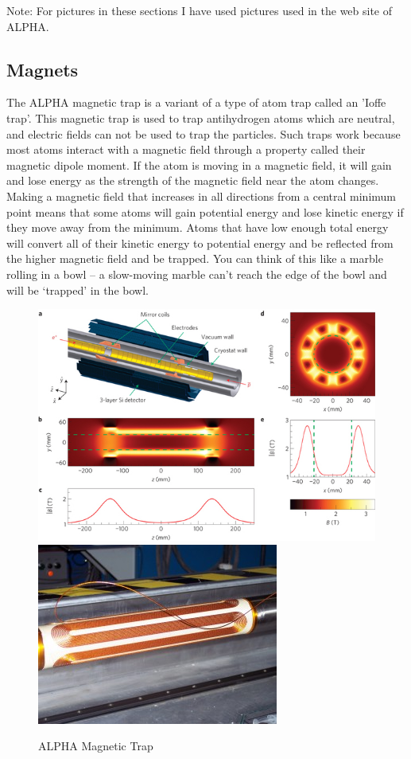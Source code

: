 \documentclass[12pt,a4paper]{article}
\begin{document}
Note: For pictures in these sections I have used pictures used in the web site of ALPHA.
\subsection{Magnets}
\label{Magnets} 
The ALPHA magnetic trap is a variant of a type of atom trap called an 'Ioffe trap'. This magnetic trap is used to trap antihydrogen atoms which are neutral, and electric fields can not be used to trap the particles. Such traps work because most atoms interact with a magnetic field through a property called their magnetic dipole moment. If the atom is moving in a magnetic field, it will gain and lose energy as the strength of the magnetic field near the atom changes. Making a magnetic field that increases in all directions from a central minimum point means that some atoms will gain potential energy and lose kinetic energy if they move away from the minimum. Atoms that have low enough total energy will convert all of their kinetic energy to potential energy and be reflected from the higher magnetic field and be trapped. You can think of this like a marble rolling in a bowl -- a slow-moving marble can't reach the edge of the bowl and will be `trapped' in the bowl.


\begin{figure}[h]
\centering
\includegraphics[scale=0.4]{magnets-trap}
\hspace{15mm}
\includegraphics[scale=0.52]{magnet}
\caption{ALPHA Magnetic Trap}
\end{figure}
\end{document}
